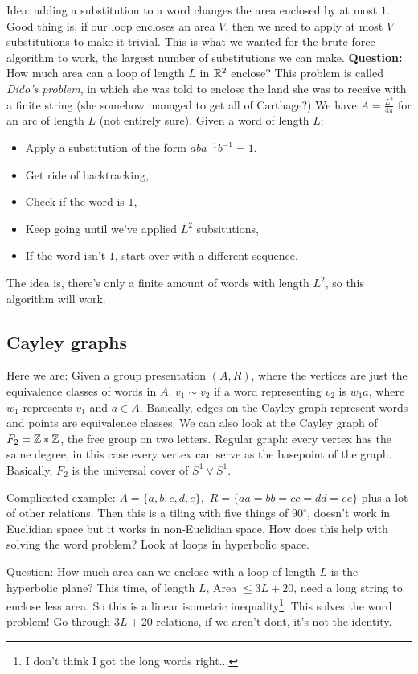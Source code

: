 Idea: adding a substitution to a word changes the area enclosed by at most $1$. Good thing is, if our loop encloses an area $V$, then we need to apply at most $V$ substitutions to make it trivial. This is what we wanted for the brute force algorithm to work, the largest number of substitutions we can make.
\textbf{Question:} How much area can a loop of length $L$ in $\mathbb{R}^2$ enclose? This problem is called \emph{Dido's problem}, in which she was told to enclose the land she was to receive with a finite string (she somehow managed to get all of Carthage?) We have $A=\frac{L^2}{4\pi}$ for an arc of length $L$ (not entirely sure). Given a word of length $L$:
\begin{itemize}
    \item Apply a substitution of the form $aba^{-1}b^{-1}=1$,
    \item Get ride of backtracking,
    \item Check if the word is $1$,
    \item Keep going until we've applied $L^2$ subsitutions,
    \item If the word isn't $1$, start over with a different sequence.
\end{itemize}
The idea is, there's only a finite amount of words with length $L^2$, so this algorithm will work.

\subsection{Cayley graphs}
Here we are: Given a group presentation $(A,R)$, where the vertices are just the equivalence classes of words in $A$. $v_1\sim v_2$ if a word representing $v_2$ is $w_1a$, where $w_1$ represents $v_1$ and $a\in A$. Basically, edges on the Cayley graph represent words and points are equivalence classes. We can also look at the Cayley graph of $F_2=\mathbb{Z}*\mathbb{Z}$, the free group on two letters. Regular graph: every vertex has the same degree, in this case every vertex can serve as the basepoint of the graph. Basically, $F_2$ is the universal cover of $S^{1} \vee S^{1} $. 

\begin{example}
    Complicated example: $A=\{a,b,c,d,e\} ,$ $R=\{aa=bb=cc=dd=ee\} $ plus a lot of other relations. Then this is a tiling with five things of $90^{\circ}$, doesn't work in Euclidian space but it works in non-Euclidian space. How does this help with solving the word problem? Look at loops in hyperbolic space.

    Question: How much area can we enclose with a loop of length $L$ is the hyperbolic plane? This time, of length $L$, Area $\leq 3L+20$, need a long string to enclose less area. So this is a linear isometric inequality\footnote{I don't think I got the long words right...}. This solves the word problem! Go through $3L+20$ relations, if we aren't dont, it's not the identity. 
\end{example}

